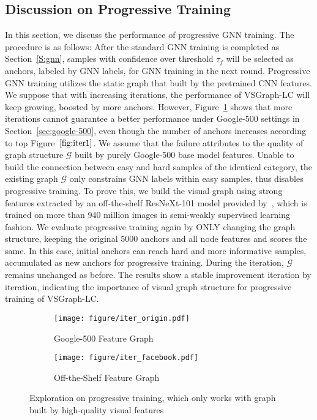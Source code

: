 \documentclass[sigconf]{acmart}
\begin{document}
\subsection{Discussion on Progressive Training}
\label{S:iterative}
In this section, we discuss the performance of progressive GNN training. The procedure is as follows:
After the standard GNN training is completed as Section~\ref{S:gnn}, samples with confidence over threshold $\tau_f$ will be selected as anchors, labeled by GNN labels, for GNN training in the next round. 
Progressive GNN training utilizes the static graph that built by the pretrained CNN features. We suppose that with increasing iterations, the performance of VSGraph-LC will keep growing, boosted by more anchors.
However, Figure~\ref{fig:iter1} shows that more iterations cannot guarantee a better performance under Google-500 settings in Section~\ref{sec:google-500}, even though the number of anchors increases according to top Figure~$\ref{fig:iter1}$.
We assume that the failure attributes to the quality of graph structure $\mathcal{G}$ built by purely Google-500 base model features. Unable to build the connection between easy and hard samples of the identical category, the existing graph $\mathcal{G}$ only constrains GNN labels within easy samples, thus disables progressive training.
To prove this, we build the visual graph using strong features extracted by an off-the-shelf ResNeXt-101 model provided by~\cite{yalniz2019billion}, which is trained on more than 940 million images in semi-weakly supervised learning fashion.
We evaluate progressive training again by ONLY changing the graph structure, keeping the original 5000 anchors and all node features and scores the same. 
In this case, initial anchors can reach hard and more informative samples, accumulated as new anchors for progressive training. During the iteration, $\mathcal{G}$ remains unchanged as before.
The results show a stable improvement iteration by iteration, indicating the importance of visual graph structure for progressive training of VSGraph-LC.


\begin{figure}[t]
	\centering
	\begin{subfigure}{.22\textwidth}
		\centering
\texttt{[image: figure/iter\_origin.pdf]}  
		\caption{Google-500 Feature Graph}
		\label{fig:iter1}
	\end{subfigure}
	\begin{subfigure}{.22\textwidth}
		\centering
\texttt{[image: figure/iter\_facebook.pdf]}  
		\caption{Off-the-Shelf Feature Graph}
		\label{fig:iter2}
	\end{subfigure}
\caption{Exploration on progressive training, which only works with graph built by high-quality visual features}
	\label{fig:iter}
\end{figure}
\end{document}
